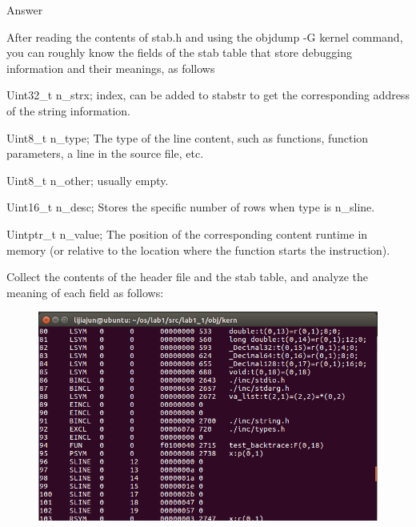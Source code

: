 \begin{flushleft}
{\Large Answer}
\end{flushleft}


After reading the contents of stab.h and using the objdump -G kernel command, you can roughly know the fields of the stab table that store debugging information and their meanings, as follows

Uint32\_t n\_strx; index, can be added to stabstr to get the corresponding address of the string information.

Uint8\_t n\_type; The type of the line content, such as functions, function parameters, a line in the source file, etc.

Uint8\_t n\_other; usually empty.

Uint16\_t n\_desc; Stores the specific number of rows when type is n\_sline.

Uintptr\_t n\_value; The position of the corresponding content runtime in memory (or relative to the location where the function starts the instruction).

Collect the contents of the header file and the stab table, and analyze the meaning of each field as follows:
\begin{figure}[H]
  \centering
  \includegraphics[width=0.8\linewidth]{figure/challenge_1}
\end{figure}

